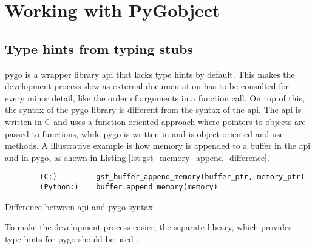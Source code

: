 \section{Working with PyGobject}


\subsection{Type hints from typing stubs}
\gls{pygo} is a wrapper library \gs \gls{api} that lacks type hints by default.
This makes the development process slow as external documentation has to be consulted for every minor detail, like the order of arguments in a function call.
On top of this, the syntax of the \gls{pygo} library is different from the syntax of the \gs \gls{api}.
The \gls{api} is written in C and uses a function oriented approach where pointers to objects are passed to functions, while \gls{pygo} is written in \py and is object oriented and use methods.
A illustrative example is how memory is appended to a buffer in the \gs \gls{api} and in \gls{pygo}, as shown in Listing \ref{lst:gst_memory_append_difference}.
\begin{listing}[H]
    \begin{verbatim}
        (C:)         gst_buffer_append_memory(buffer_ptr, memory_ptr)
        (Python:)    buffer.append_memory(memory)
    \end{verbatim}
    \caption{Difference between \gs \gls{api} and \gls{pygo} syntax}
    \label{lst:gst_memory_append_difference}
\end{listing}
To make the development process easier, the separate  library, which provides type hints for \gls{pygo} should be used \cite{pygobjectTypingStubsPyGObject2023}.
